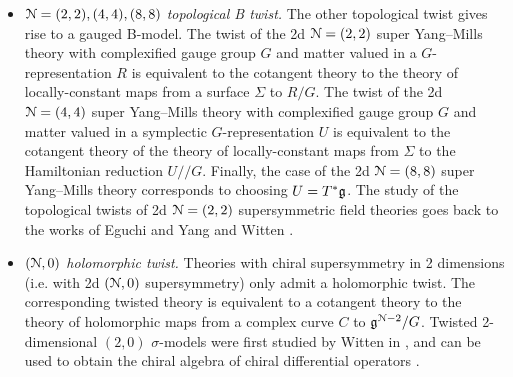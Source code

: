 \documentclass[10pt, oneside]{article}
\newcommand{\ham}{/\!\!/}
\begin{document}
\begin{itemize}
 \item \emph{$\mathcal{N}=(2,2), (4,4), (8,8)$ topological B twist.} The other topological twist gives rise to a gauged B-model. The twist of the 2d $\mathcal N=(2, 2)$ super Yang--Mills theory with complexified gauge group $G$ and matter valued in a $G$-representation $R$ is equivalent to the cotangent theory to the theory of locally-constant maps from a surface $\Sigma$ to $R/G$. The twist of the 2d $\mathcal N=(4, 4)$ super Yang--Mills theory with complexified gauge group $G$ and matter valued in a symplectic $G$-representation $U$ is equivalent to the cotangent theory of the theory of locally-constant maps from $\Sigma$ to the Hamiltonian reduction $U\ham G$. Finally, the case of the 2d $\mathcal N=(8, 8)$ super Yang--Mills theory corresponds to choosing $U=T^*\mathfrak g$. The study of the topological twists of 2d $\mathcal{N}=(2,2)$ supersymmetric field theories goes back to the works of Eguchi and Yang \cite{EguchiYang} and Witten \cite{Wittenmirror}.
 \item \emph{$(\mathcal N, 0)$ holomorphic twist.} Theories with chiral supersymmetry in 2 dimensions (i.e. with 2d $(\mathcal N, 0)$ supersymmetry) only admit a holomorphic twist. The corresponding twisted theory is equivalent to a cotangent theory to the theory of holomorphic maps from a complex curve $C$ to $\mathfrak g^{\mathcal N-2} / G$. Twisted 2-dimensional $(2,0)$ $\sigma$-models were first studied by Witten in \cite{Wittenmirror}, and can be used to obtain the chiral algebra of chiral differential operators \cite{WittenCDO}. 
\end{itemize}
\end{document}
